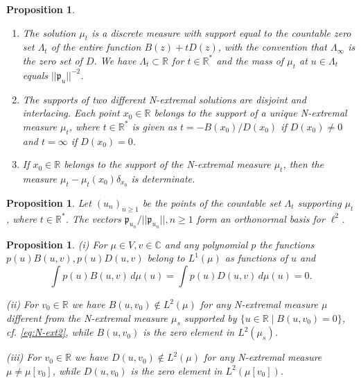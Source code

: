 \documentclass[10pt,a4paper]{amsart}
\newtheorem{prop}[thm]{Proposition}
\newcommand{\C}{\mathbb{C}}
\newcommand{\R}{\mathbb{R}}
\begin{document}
\setcounter{section}{2}
\setcounter{equation}{3}
\setcounter{thm}{1}
\begin{prop}\label{thm:supportNext}
\begin{enumerate}
\item[(i)] The  solution $\mu_t$ is a discrete measure with support equal to the countable zero set $\Lambda_t$ of the entire function $B(z)+tD(z)$, with the convention that $\Lambda_\infty$ is the zero set of $D$. We have $\Lambda_t\subset\R$ for $t\in\R^*$ and
the mass of $\mu_t$ at $u\in\Lambda_t$ equals $||\mathfrak{p}_u||^{-2}$. 
\item[(ii)] The supports of two different N-extremal solutions are disjoint and interlacing. Each point $x_0\in\R$ belongs to the support of a unique N-extremal measure $\mu_t$, where
$t\in\R^*$ is given  as $t=-B(x_0)/D(x_0)$ if $D(x_0)\neq 0$ and $t=\infty$ if $D(x_0)=0$.
\item[(iii)] If $x_0\in\R$ belongs to the support of the N-extremal measure $\mu_t$, then the measure $\mu_t-\mu_t(x_0)\delta_{x_0}$ is determinate.
\end{enumerate}
\end{prop}

\setcounter{section}{2}
\setcounter{equation}{4}
\setcounter{thm}{2}
\begin{prop}\label{thm:ONB} Let $(u_n)_{n\ge 1}$ be the points of the countable set $\Lambda_t$ supporting $\mu_t$, where $t\in\R^*$. The vectors $\mathfrak{p}_{u_n}/||\mathfrak{p}_{u_n}||, n\ge 1$ form an orthonormal basis for $\ell^2$.
\end{prop}

\setcounter{section}{3}
\setcounter{equation}{0}
\setcounter{thm}{0}
\begin{prop}\label{thm:1-2} (i) For $\mu\in V, v\in\C$ and any polynomial $p$ the functions $p(u)B(u,v), p(u)D(u,v)$ belong to $L^1(\mu)$ as functions of $u$ and
$$
\int p(u)B(u,v)\,d\mu(u)=\int p(u)D(u,v)\,d\mu(u)=0.
$$ 

(ii) For $v_0\in\R$ we have $B(u,v_0)\notin L^2(\mu)$ for any N-extremal measure $\mu$ different from the N-extremal measure $\mu_s$ supported by $\{u\in\R \mid B(u,v_0)=0\}$, cf. \eqref{eq:N-ext2}, while $B(u,v_0)$ is the zero element in $L^2(\mu_s)$.

(iii) For $v_0\in\R$ we have $D(u,v_0)\notin L^2(\mu)$ for any N-extremal measure $\mu\neq \mu[v_0]$, while $D(u,v_0)$ is the zero element in $L^2(\mu[v_0])$.
 \end{prop} 
\end{document}
